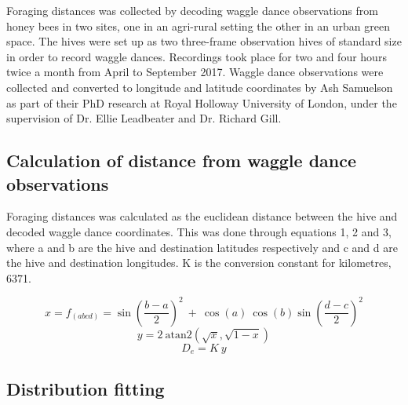 \documentclass[11pt,usenames,dvipsnames,a4paper]{article}
\begin{document}
\begin{linenumbers}
\hspace{\parindent}
Foraging distances was collected by decoding waggle dance observations from honey bees in two sites, one in an agri-rural setting the other in an urban green space. The hives were set up as two three-frame observation hives of standard size in order to record waggle dances. Recordings took place for two and four hours twice a month from April to September 2017. Waggle dance observations were collected and converted to longitude and latitude coordinates by Ash Samuelson as part of their PhD research at Royal Holloway University of London, under the supervision of Dr. Ellie Leadbeater and Dr. Richard Gill.
\end{linenumbers}

\subsection{Calculation of distance from waggle dance observations}

\begin{linenumbers}
\hspace{\parindent}
Foraging distances was calculated as the euclidean distance between the hive and decoded waggle dance coordinates. This was done through equations 1, 2 and 3, where a and b are the hive and destination latitudes respectively and c and d are the hive and destination longitudes. K is the conversion constant for kilometres, 6371.
\end{linenumbers}
\begin{equation}
x = f_{(abcd)} = \sin\left(\frac{b - a}{2}\right)^2\ +\ \cos(a)\ \cos(b) \sin\left(\frac{d - c}{2}\right)^2 
\end{equation}
\begin{equation}
y = 2\ \text{atan2}(\sqrt{x}, \sqrt{1 - x})
\end{equation}
\begin{equation}
D_e = K\ y
\end{equation}

\subsection{Distribution fitting}
\end{document}
